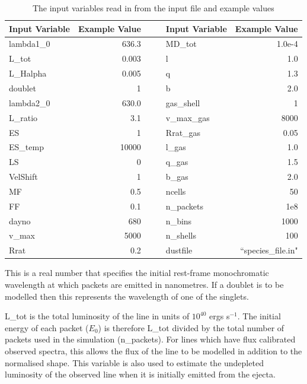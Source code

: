 	\begin{table}[htdp]
	\caption{The input variables read in from the input file and example values}
	\begin{center}
	\def\arraystretch{1.5}
	\begin{tabular}{l r c c l r}
	\toprule
	Input Variable & Example Value &&& Input Variable & Example Value\\
	\midrule
	lambda1\_0 & 636.3 &&& MD\_tot & 1.0e-4\\
	L\_tot & 0.003 &&& l & 1.0\\
	L\_Halpha & 0.005 &&& q & 1.3\\
	doublet & 1 &&& b & 2.0\\
	lambda2\_0 & 630.0 &&& gas\_shell & 1\\
	L\_ratio & 3.1&&& v\_max\_gas & 8000\\
	ES & 1 &&& Rrat\_gas & 0.05\\
	ES\_temp & 10000 &&& l\_gas & 1.0\\
	LS & 0 &&& q\_gas & 1.5\\
	VelShift & 1 &&& b\_gas & 2.0\\
	MF & 0.5 &&& ncells & 50\\
	FF & 0.1 &&& n\_packets & 1e8\\
	dayno & 680 &&& n\_bins & 1000\\
	v\_max & 5000 &&& n\_shells & 100\\
	Rrat & 0.2 &&& dustfile & ``species\_file.in"\\
	\bottomrule
	\end{tabular}
	\end{center}
	\label{tbl:input}
\end{table}%

\vspace{0.8cm}


This is a real number that specifies the initial rest-frame monochromatic wavelength at which packets are emitted in nanometres.  If a doublet is to be modelled then this represents the wavelength of one of the singlets.


L\_tot is the total luminosity of the line in units of $10^{40}$ ergs s$^{-1}$.  The initial energy of each packet ($E_0$) is therefore L\_tot divided by the total number of packets used in the simulation (n\_packets). For lines which have flux calibrated observed spectra, this allows the flux of the line to be modelled in addition to the normalised shape.  This variable is also used to estimate the undepleted luminosity of the observed line when it is initially emitted from the ejecta.

